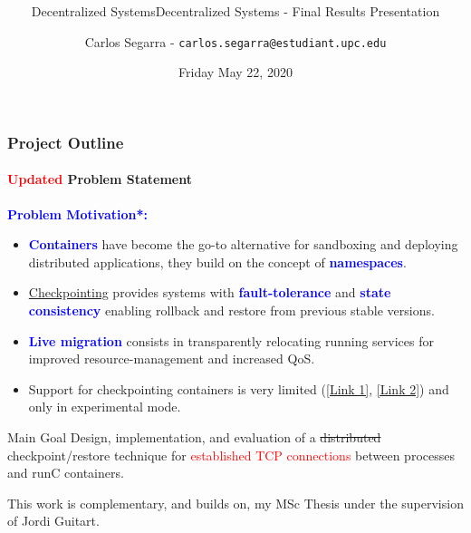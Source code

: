 \documentclass[9pt,    %
    english,            %
    xcolor=table,       %
    envcountsect,        %
    aspectratio=169     %
]{beamer}
\subtitle{Decentralized Systems} %
\title[C/R of Established TCP Connections] %
    {\Large \mainTitle \\ \normalsize \secondTitle}
\subtitle{Decentralized Systems - Final Results Presentation} %
\date[May 22, 2020] %
    {Friday May 22, 2020}
\author[] %
{Carlos Segarra - \texttt{carlos.segarra@estudiant.upc.edu}}
\begin{document}
\begin{frame}
  \titlepage
\end{frame}

\begin{frame}
    \frametitle{Project Outline}
    \framesubtitle{\textcolor{red}{Updated} Problem Statement}


    \textbf{\textcolor{blue}{Problem Motivation*:}}
    \begin{itemize}
        \item \textbf{\textcolor{blue}{Containers}} have become the go-to alternative for sandboxing and deploying distributed applications, they build on the concept of \textbf{\textcolor{blue}{namespaces}}.
        \item \href{https://en.wikipedia.org/wiki/Application_checkpointing}{Checkpointing} provides systems with \textbf{\textcolor{blue}{fault-tolerance}} and \textbf{\textcolor{blue}{state consistency}} enabling rollback and restore from previous stable versions.
        \item \textbf{\textcolor{blue}{Live migration}} consists in transparently relocating running services for improved resource-management and increased QoS.
        \item Support for checkpointing containers is very limited (\href{https://github.com/docker/cli/blob/master/experimental/checkpoint-restore.md}{[Link 1]}, \href{https://criu.org/Docker}{[Link 2]}) and only in experimental mode. 
    \end{itemize}

    \begin{alertblock}{Main Goal}
        Design, implementation, and evaluation of a \sout{distributed} checkpoint/restore technique for \textcolor{red}{established TCP connections} between processes and runC containers.
    \end{alertblock}

    \vspace{1pt}
    \small
    \begin{description}
        \item *This work is complementary, and builds on, my MSc Thesis under the supervision of Jordi Guitart.
    \end{description}
\end{frame}
\end{document}

